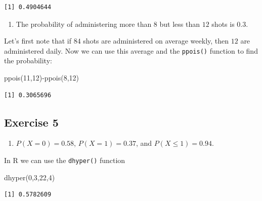 \documentclass[
  letterpaper,
  DIV=11,
  numbers=noendperiod]{scrreprt}
\newenvironment{Shaded}{\begin{snugshade}}{\end{snugshade}}
\newcommand{\DecValTok}[1]{\textcolor[rgb]{0.68,0.00,0.00}{#1}}
\newcommand{\FunctionTok}[1]{\textcolor[rgb]{0.28,0.35,0.67}{#1}}
\newcommand{\NormalTok}[1]{\textcolor[rgb]{0.00,0.23,0.31}{#1}}
\newcommand{\SpecialCharTok}[1]{\textcolor[rgb]{0.37,0.37,0.37}{#1}}
\providecommand{\tightlist}{%
  \setlength{\itemsep}{0pt}\setlength{\parskip}{0pt}}\usepackage{longtable,booktabs,array}
\begin{document}
\begin{verbatim}
[1] 0.4904644
\end{verbatim}

\begin{enumerate}
\def\labelenumi{\arabic{enumi}.}
\setcounter{enumi}{2}
\tightlist
\item
  The probability of administering more than \(8\) but less than \(12\)
  shots is \(0.3\).
\end{enumerate}

Let's first note that if \(84\) shots are administered on average
weekly, then \(12\) are administered daily. Now we can use this average
and the \texttt{ppois()} function to find the probability:

\begin{Shaded}
\begin{Highlighting}[numbers=left,,]
\FunctionTok{ppois}\NormalTok{(}\DecValTok{11}\NormalTok{,}\DecValTok{12}\NormalTok{)}\SpecialCharTok{{-}}\FunctionTok{ppois}\NormalTok{(}\DecValTok{8}\NormalTok{,}\DecValTok{12}\NormalTok{)}
\end{Highlighting}
\end{Shaded}

\begin{verbatim}
[1] 0.3065696
\end{verbatim}

\hypertarget{exercise-5-3}{%
\subsection*{Exercise 5}\label{exercise-5-3}}

\begin{enumerate}
\def\labelenumi{\arabic{enumi}.}
\tightlist
\item
  \(P(X=0)=0.58\), \(P(X=1)=0.37\), and \(P(X \leq 1)=0.94\).
\end{enumerate}

In R we can use the \texttt{dhyper()} function

\begin{Shaded}
\begin{Highlighting}[numbers=left,,]
\FunctionTok{dhyper}\NormalTok{(}\DecValTok{0}\NormalTok{,}\DecValTok{3}\NormalTok{,}\DecValTok{22}\NormalTok{,}\DecValTok{4}\NormalTok{)}
\end{Highlighting}
\end{Shaded}

\begin{verbatim}
[1] 0.5782609
\end{verbatim}
\end{document}
